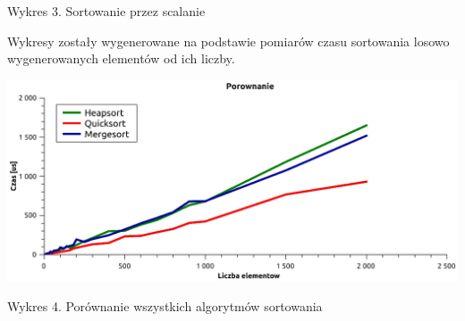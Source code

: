 \documentclass[12pt,a4paper]{article}
\begin{document}
Wykres 3. Sortowanie przez scalanie \newpage

Wykresy zostały wygenerowane na podstawie pomiarów czasu sortowania losowo wygenerowanych elementów od ich liczby.    \newline

\includegraphics[scale=0.6]{./wszystkie}

Wykres 4. Porównanie wszystkich algorytmów sortowania \newline
\end{document}
